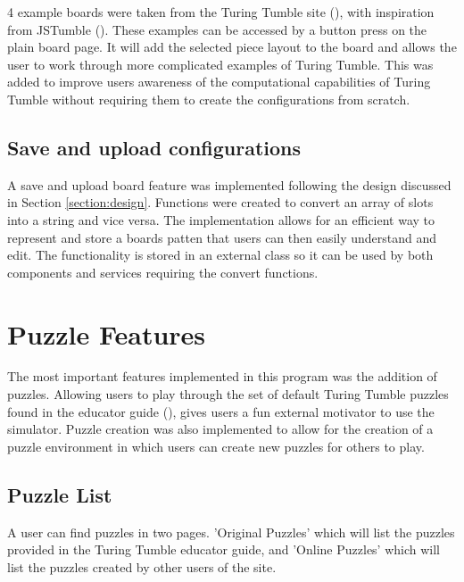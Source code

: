 \documentclass{l4proj}
\begin{document}
4 example boards were taken from the Turing Tumble site (\cite{turing_tumble_site}), with inspiration from JSTumble (\cite{jstumble}). These examples can be accessed by a button press on the plain board page. It will add the selected piece layout to the board and allows the user to work through more complicated examples of Turing Tumble. This was added to improve users awareness of the computational capabilities of Turing Tumble without requiring them to create the configurations from scratch. 

\subsection{Save and upload configurations}
\label{section:save-upload}
A save and upload board feature was implemented following the design discussed in Section \ref{section:design}. Functions were created to convert an array of slots into a string and vice versa. The implementation allows for an efficient way to represent and store a boards patten that users can then easily understand and edit. The functionality is stored in an external class so it can be used by both components and services requiring the convert functions.

\section{Puzzle Features}
The most important features implemented in this program was the addition of puzzles. Allowing users to play through the set of default Turing Tumble puzzles found in the educator guide (\cite{educator_resources}), gives users a fun external motivator to use the simulator. Puzzle creation was also implemented to allow for the creation of a puzzle environment in which users can create new puzzles for others to play.

\subsection{Puzzle List}
A user can find puzzles in two pages. 'Original Puzzles' which will list the puzzles provided in the Turing Tumble educator guide, and 'Online Puzzles' which will list the puzzles created by other users of the site.
\end{document}
